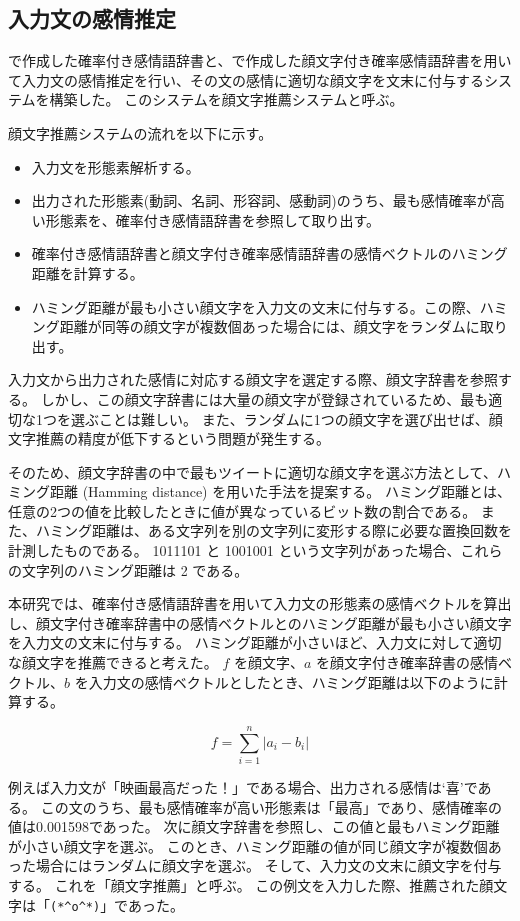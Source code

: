\documentclass[11pt,a4j]{jsarticle}
\begin{document}
\subsection{入力文の感情推定}
で作成した確率付き感情語辞書と、で作成した顔文字付き確率感情語辞書を用いて入力文の感情推定を行い、その文の感情に適切な顔文字を文末に付与するシステムを構築した。
このシステムを顔文字推薦システムと呼ぶ。

顔文字推薦システムの流れを以下に示す。

\begin{itemize}
  \item
    入力文を形態素解析する。
  \item
    出力された形態素(動詞、名詞、形容詞、感動詞)のうち、最も感情確率が高い形態素を、確率付き感情語辞書を参照して取り出す。
  \item
    確率付き感情語辞書と顔文字付き確率感情語辞書の感情ベクトルのハミング距離を計算する。
  \item
    ハミング距離が最も小さい顔文字を入力文の文末に付与する。この際、ハミング距離が同等の顔文字が複数個あった場合には、顔文字をランダムに取り出す。
\end{itemize}

入力文から出力された感情に対応する顔文字を選定する際、顔文字辞書を参照する。
しかし、この顔文字辞書には大量の顔文字が登録されているため、最も適切な1つを選ぶことは難しい。
また、ランダムに1つの顔文字を選び出せば、顔文字推薦の精度が低下するという問題が発生する。

そのため、顔文字辞書の中で最もツイートに適切な顔文字を選ぶ方法として、ハミング距離 (Hamming distance) を用いた手法を提案する。
ハミング距離とは、任意の2つの値を比較したときに値が異なっているビット数の割合である。
また、ハミング距離は、ある文字列を別の文字列に変形する際に必要な置換回数を計測したものである。
1011101 と 1001001 という文字列があった場合、これらの文字列のハミング距離は 2 である。

本研究では、確率付き感情語辞書を用いて入力文の形態素の感情ベクトルを算出し、顔文字付き確率辞書中の感情ベクトルとのハミング距離が最も小さい顔文字を入力文の文末に付与する。
ハミング距離が小さいほど、入力文に対して適切な顔文字を推薦できると考えた。
$f$ を顔文字、$a$ を顔文字付き確率辞書の感情ベクトル、$b$ を入力文の感情ベクトルとしたとき、ハミング距離は以下のように計算する。

\[
  f=\sum_{i=1}^{n} |a_i-b_i|
\]

例えば入力文が「映画最高だった！」である場合、出力される感情は`喜'である。
この文のうち、最も感情確率が高い形態素は「最高」であり、感情確率の値は0.001598であった。
次に顔文字辞書を参照し、この値と最もハミング距離が小さい顔文字を選ぶ。
このとき、ハミング距離の値が同じ顔文字が複数個あった場合にはランダムに顔文字を選ぶ。
そして、入力文の文末に顔文字を付与する。
これを「顔文字推薦」と呼ぶ。
この例文を入力した際、推薦された顔文字は「\verb|(*^o^*)|」であった。
\end{document}
